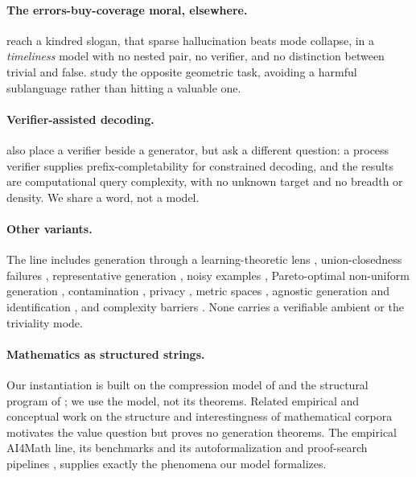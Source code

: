 \documentclass[11pt]{article}
\numberwithin{equation}{section}
\theoremstyle{plain}
\theoremstyle{definition}
\theoremstyle{remark}
\begin{document}
\paragraph{The errors-buy-coverage moral, elsewhere.}
 reach a kindred slogan, that sparse hallucination beats mode collapse,
in a \emph{timeliness} model with no nested pair, no verifier, and no distinction between
trivial and false.  study the opposite geometric task, avoiding
a harmful sublanguage rather than hitting a valuable one.

\paragraph{Verifier-assisted decoding.}
 also place a verifier beside a generator, but ask a different
question: a process verifier supplies prefix-completability for constrained decoding, and the
results are computational query complexity, with no unknown target and no breadth or density.
We share a word, not a model.

\paragraph{Other variants.}
The line includes generation through a learning-theoretic lens \citep{li2025generation},
union-closedness failures \citep{hanneke2025union}, representative generation
\citep{peale2025representative}, noisy examples \citep{raman2025noisy,li2026quantifying},
Pareto-optimal non-uniform generation \citep{charikar2025pareto}, contamination
\citep{mehrotra2025contamination}, privacy \citep{mehrotra2026private}, metric spaces
\citep{li2026metric}, agnostic generation and identification \citep{hogsgaard2026agnostic},
and complexity barriers \citep{arenas2025complexity}. None carries a verifiable ambient or the
triviality mode.

\paragraph{Mathematics as structured strings.}
Our instantiation is built on the compression model of \citet{aksenov2026compression} and the
structural program of \citet{barkeshli2026structure}; we use the model, not its theorems.
Related empirical and conceptual work on the structure and interestingness of mathematical
corpora
\citep{wernhard2025grammar,colton2000interestingness,herrmann2026interestingness,tsoukalas2025interestingness}
motivates the value question but proves no generation theorems. The empirical AI4Math line,
its benchmarks and its autoformalization and proof-search pipelines
\citep{zheng2022minif2f,yang2023leandojo,jiang2023draft}, supplies exactly the phenomena our
model formalizes.
\end{document}
